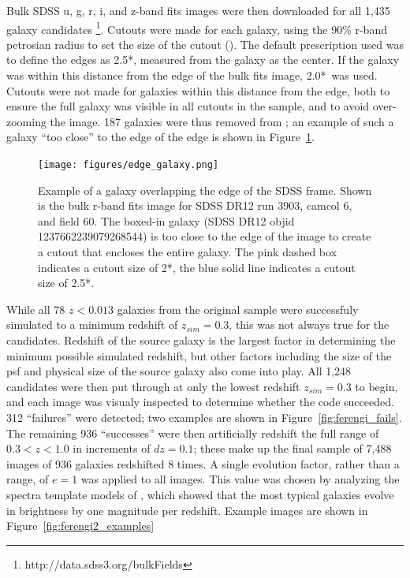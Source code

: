 Bulk SDSS u, g, r, i, and z-band fits images were then downloaded for all 1,435 galaxy candidates \footnote{http://data.sdss3.org/bulkFields}. Cutouts were made for each galaxy, using the 90\% r-band petrosian radius to set the size of the cutout (\radr). The default prescription used was to define the edges as 2.5*\radr, measured from the galaxy as the center. If the galaxy was within this distance from the edge of the bulk fits image, 2.0*\radr~was used. Cutouts were not made for galaxies within this distance from the edge, both to ensure the full galaxy was visible in all cutouts in the sample, and to avoid over-zooming the image. 187 galaxies were thus removed from ; an example of such a galaxy ``too close'' to the edge of the edge is shown in Figure~\ref{fig:edge_galaxy}.  



\begin{figure}
\begin{center}
\texttt{[image: figures/edge\_galaxy.png]}
\caption{Example of a galaxy overlapping the edge of the SDSS frame. Shown is the bulk r-band fits image for SDSS DR12 run 3903, camcol 6, and field 60. The boxed-in galaxy (SDSS DR12 objid 1237662239079268544) is too close to the edge of the image to create a cutout that encloses the entire galaxy. The pink dashed box indicates a cutout size of 2*\radr, the blue solid line indicates a cutout size of 2.5*\radr. } 
\label{fig:edge_galaxy}
\end{center}
\end{figure}

While all 78 $z<0.013$ galaxies from the original \ferengi{} sample were successfuly simulated to a minimum redshift of $z_{sim}=0.3$, this was not always true for the  candidates. Redshift of the source galaxy is the largest factor in determining the minimum possible simulated redshift, but other factors including the size of the psf and physical size of the source galaxy also come into play. All 1,248 candidates were then put through \ferengi{} at only the lowest redshift $z_{sim}=0.3$ to begin, and each image was visualy inspected to determine whether the code succeeded. 312 ``failures'' were detected; two examples are shown in Figure~\ref{fig:ferengi_fails}. The remaining 936 ``successes'' were then artificially redshift the full range of $0.3<z<1.0$ in increments of $dz = 0.1$; these make up the final  sample of 7,488 images of 936 galaxies redshifted 8 times. A single evolution factor, rather than a range, of $e=1$ was applied to all images. This value was chosen by analyzing the spectra template models of \cite{Brinchmann2004a}, which showed that the most typical galaxies evolve in brightness by one magnitude per redshift. Example images are shown in Figure~\ref{fig:ferengi2_examples}


